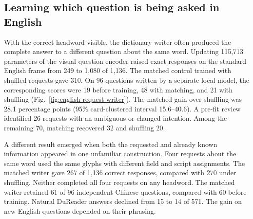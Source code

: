 \subsection*{Learning which question is being asked in English}
With the correct headword visible, the dictionary writer often produced the complete answer to a different question about the same word. Updating 115,713 parameters of the visual question encoder raised exact responses on the standard English frame from 249 to 1,080 of 1,136. The matched control trained with shuffled requests gave 310. On 96 questions written by a separate local model, the corresponding scores were 19 before training, 48 with matching, and 21 with shuffling (Fig.~\ref{fig:english-request-writer}). The matched gain over shuffling was 28.1 percentage points (95\% card-clustered interval 15.6--40.6). A pre-fit review identified 26 requests with an ambiguous or changed intention. Among the remaining 70, matching recovered 32 and shuffling 20.

A different result emerged when both the requested and already known information appeared in one unfamiliar construction. Four requests about the same word used the same glyphs with different field and script assignments. The matched writer gave 267 of 1,136 correct responses, compared with 270 under shuffling. Neither completed all four requests on any headword. The matched writer retained 61 of 96 independent Chinese questions, compared with 60 before training. Natural DuReader answers declined from 15 to 14 of 571. The gain on new English questions depended on their phrasing.

